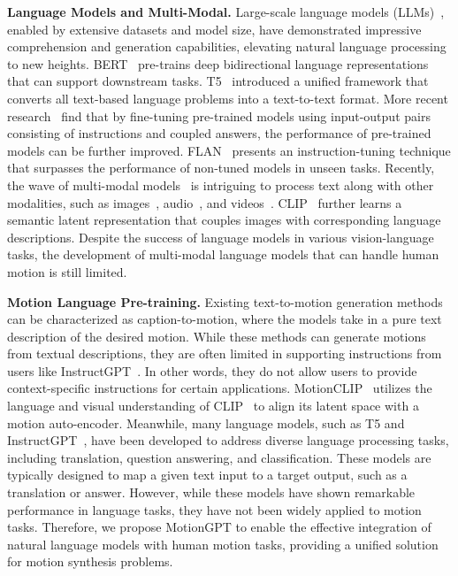 \textbf{Language Models and Multi-Modal.}
Large-scale language models (LLMs)~\cite{devlin2018bert,dai2019transformer,raffel2020t5,brown2020gpt3,zhang2022opt,touvron2023llama}, enabled by extensive datasets and model size, have demonstrated impressive comprehension and generation capabilities, elevating natural language processing to new heights. BERT~\cite{devlin2018bert} pre-trains deep bidirectional language representations that can support downstream tasks. T5~\cite{raffel2020t5} introduced a unified framework that converts all text-based language problems into a text-to-text format. More recent research~\cite{wei2021finetuned,bach2022promptsource,ouyang2022instructgpt,chung2022flant5} find that by fine-tuning pre-trained models using input-output pairs consisting of instructions and coupled answers, the performance of pre-trained models can be further improved. FLAN~\cite{chung2022flant5} presents an instruction-tuning technique that surpasses the performance of non-tuned models in unseen tasks. 
Recently, the wave of multi-modal models~\cite{li2022blip,huang2023language,li2023blip2} is intriguing to process text along with other modalities, such as images~\cite{li2022blip,huang2023language,girdhar2023imagebind}, audio~\cite{guzhov2022audioclip,girdhar2023imagebind}, and videos~\cite{xu2021videoclip}. CLIP~\cite{radford2021clip} further learns a semantic latent representation that couples images with corresponding language descriptions.
Despite the success of language models in various vision-language tasks, the development of multi-modal language models that can handle human motion is still limited.

\textbf{Motion Language Pre-training.} Existing text-to-motion generation methods~\cite{Guo_2022_CVPR_humanml3d,petrovich22temos, mdm2022human,chuan2022tm2t,ahuja2019language2pose,kim2022flame} can be characterized as caption-to-motion, where the models take in a pure text description of the desired motion.
%
While these methods can generate motions from textual descriptions, they are often limited in supporting instructions from users like InstructGPT~\cite{ouyang2022instructgpt}. In other words, they do not allow users to provide context-specific instructions for certain applications.
%
MotionCLIP~\cite{tevet2022motionclip} utilizes the language and visual understanding of CLIP~\cite{radford2021clip} to align its latent space with a motion auto-encoder.
%
Meanwhile, many language models, such as T5\cite{raffel2020t5} and InstructGPT~\cite{ouyang2022instructgpt}, have been developed to address diverse language processing tasks, including translation, question answering, and classification.
%
These models are typically designed to map a given text input to a target output, such as a translation or answer. 
%
However, while these models have shown remarkable performance in language tasks, they have not been widely applied to motion tasks. Therefore, we propose MotionGPT to enable the effective integration of natural language models with human motion tasks, providing a unified solution for motion synthesis problems.



